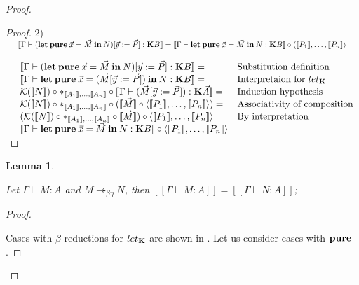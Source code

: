 \documentclass[a4paper]{article}
\newtheorem{lemma}{Lemma}
\begin{document}
\begin{proof}
\begin{proof}
\vspace{\baselineskip}

2) $\begin{array}{lll}&[\![\Gamma \vdash ({\bf let \: pure} \: \vec{x} = \vec{M} {\: \bf in \:} N) [\vec{y} := \vec{P}] : {\bf K} B]\!]
=[\![\Gamma \vdash {\bf let \: pure} \: \vec{x} = \vec{M} {\: \bf in \:} N : {\bf K}B]\!] \circ \langle [\![P_1]\!],\dots,[\![P_n]\!]\rangle& \end{array}$

\vspace{\baselineskip}

$\begin{array}{lll}
&[\![\Gamma \vdash ({\bf let \: pure} \: \vec{x} = \vec{M} {\: \bf in \:} N) [\vec{y} := \vec{P}] : {\bf K} B]\!] =& \text{Substitution definition}\\
&[\![\Gamma \vdash {\bf let \: pure} \: \vec{x} = (\vec{M} [\vec{y} := \vec{P}]) {\: \bf in \:} N : {\bf K}B]\!] =& \text{Interpretaion for $let_{\bf K}$} \\
&\mathcal{K}([\![N]\!]) \circ \ast_{[\![A_1]\!],\dots,[\![A_n]\!]} \circ [\![\Gamma \vdash (\vec{M} [\vec{y} := \vec{P}]) : {\bf K}\vec{A}]\!] =& \text{Induction hypothesis} \\
&\mathcal{K}([\![N]\!]) \circ \ast_{[\![A_1]\!],\dots,[\![A_n]\!]} \circ ([\![\vec{M}]\!] \circ \langle [\![P_1]\!],\dots,[\![P_n]\!]\rangle) = & \text{Associativity of composition} \\
&(\mathcal{K}([\![N]\!]) \circ \ast_{[\![A_1]\!],\dots,[\![A_n]\!]} \circ [\![\vec{M}]\!]) \circ \langle [\![P_1]\!],\dots,[\![P_n]\!]\rangle = & \text{By interpretation} \\
&[\![\Gamma \vdash {\bf let \: pure} \: \vec{x} = \vec{M} {\: \bf in \:} N : {\bf K}B]\!] \circ \langle [\![P_1]\!],\dots,[\![P_n]\!]\rangle&
\end{array}$

\end{proof}

\begin{lemma}
  $ $

  Let $\Gamma \vdash M : A$ and $M \twoheadrightarrow_{\beta \eta} N$, then $[\![\Gamma \vdash M : A]\!] = [\![\Gamma \vdash N : A]\!]$;
\end{lemma}

\begin{proof}
  $ $

Cases with $\beta$-reductions for $let_{\bf K}$ are shown in \cite{ModalK1}. Let us consider cases with ${\bf pure}$.


\end{proof}
\end{proof}
\end{document}
